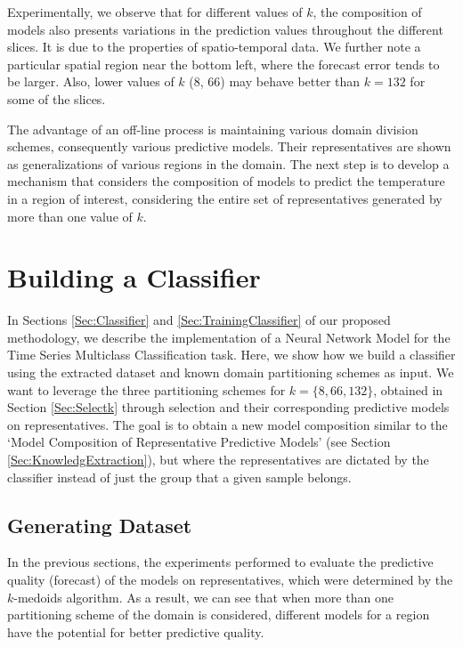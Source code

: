 Experimentally, we observe that for different values of $k$, the composition of models also presents variations in the prediction values throughout the different slices. It is due to the properties of spatio-temporal data. We further note a particular spatial region near the bottom left, where the forecast error tends to be larger. Also, lower values of $k$ (8, 66) may behave better than $k=132$ for some of the slices. 

The advantage of an off-line process is maintaining various domain division schemes, consequently various predictive models. Their representatives are shown as generalizations of various regions in the domain. The next step is to develop a mechanism that considers the composition of models to predict the temperature in a region of interest, considering the entire set of representatives generated by more than one value of $k$.

\section{Building a Classifier}
\label{Sec:ExperimentsTrainingClassifier}

In Sections \ref{Sec:Classifier} and \ref{Sec:TrainingClassifier} of our proposed methodology, we describe the implementation of a Neural Network Model for the Time Series Multiclass Classification task. Here, we show how we build a classifier using the extracted dataset and known domain partitioning schemes as input. We want to leverage the three partitioning schemes for $k = \{8, 66, 132\}$, obtained in Section \ref{Sec:Selectk} through selection and their corresponding predictive models on representatives. The goal is to obtain a new model composition similar to the `Model Composition of Representative Predictive Models' (see Section \ref{Sec:KnowledgExtraction}), but where the representatives are dictated by the classifier instead of just the group that a given sample belongs. 

\subsection{Generating Dataset}
\label{Sec:ClassifierDataset}

In the previous sections, the experiments performed to evaluate the predictive quality (forecast) of the models on representatives, which were determined by the $k$-medoids algorithm. As a result, we can see that when more than one partitioning scheme of the domain is considered, different models for a region have the potential for better predictive quality.


